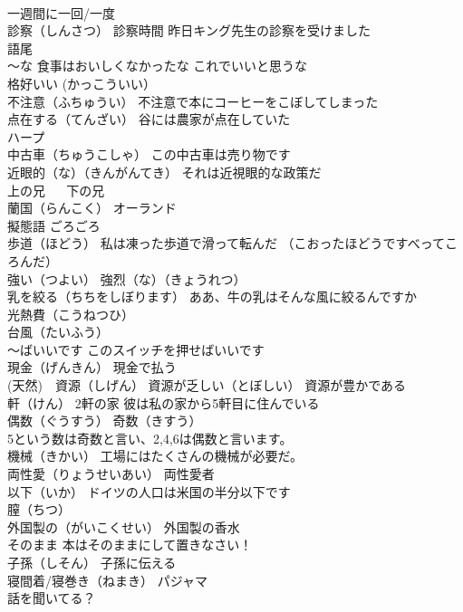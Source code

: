 \documentclass[8pt]{extreport}
\begin{document}
\begin{CJK}{UTF8}{min}
\\	一週間に一回/一度
\\	診察（しんさつ） 診察時間 昨日キング先生の診察を受けました
\\	語尾　
\\	～な 食事はおいしくなかったな これでいいと思うな
\\	格好いい (かっこういい）
\\	不注意（ふちゅうい） 不注意で本にコーヒーをこぼしてしまった
\\	点在する（てんざい） 谷には農家が点在していた
\\	ハープ
\\	中古車（ちゅうこしゃ） この中古車は売り物です
\\	近眼的（な）（きんがんてき） それは近視眼的な政策だ
\\	上の兄 　 下の兄
\\	蘭国（らんこく） オーランド
\\	擬態語	ごろごろ
\\	歩道（ほどう） 私は凍った歩道で滑って転んだ （こおったほどうですべってころんだ）
\\	強い（つよい） 強烈（な）（きょうれつ）
\\	乳を絞る（ちちをしぼります） ああ、牛の乳はそんな風に絞るんですか
\\	光熱費（こうねつひ）
\\	台風（たいふう）
\\	～ばいいです このスイッチを押せばいいです
\\	現金（げんきん） 現金で払う
\\	(天然)　資源（しげん） 資源が乏しい（とぼしい） 資源が豊かである
\\	軒（けん） 2軒の家 彼は私の家から5軒目に住んでいる
\\	偶数（ぐうすう） 奇数（きすう） 
\\	5という数は奇数と言い、2,4,6は偶数と言います。
\\	機械（きかい） 工場にはたくさんの機械が必要だ。
\\	両性愛（りょうせいあい） 両性愛者
\\	以下（いか） ドイツの人口は米国の半分以下です
\\	膣（ちつ）
\\	外国製の（がいこくせい） 外国製の香水
\\	そのまま 本はそのままにして置きなさい！
\\	子孫（しそん） 子孫に伝える
\\	寝間着/寝巻き（ねまき） パジャマ
\\	話を聞いてる？

\end{CJK}
\end{document}
